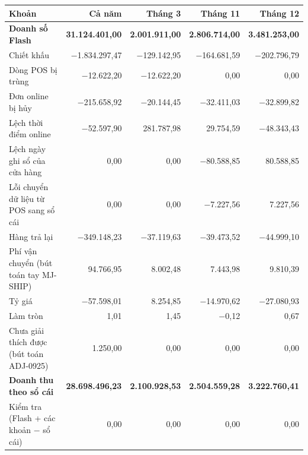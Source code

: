 \begin{tabular}{@{}L{6.0cm} r r r r@{}}
\toprule
Khoản & Cả năm & Tháng 3 & Tháng 11 & Tháng 12 \\
\midrule
\textbf{Doanh số Flash} & \textbf{31.124.401,00} & \textbf{2.001.911,00} & \textbf{2.806.714,00} & \textbf{3.481.253,00} \\
Chiết khấu & $-$1.834.297,47 & $-$129.142,95 & $-$164.681,59 & $-$202.796,79 \\
Dòng POS bị trùng & $-$12.622,20 & $-$12.622,20 & 0,00 & 0,00 \\
Đơn online bị hủy & $-$215.658,92 & $-$20.144,45 & $-$32.411,03 & $-$32.899,82 \\
Lệch thời điểm online & $-$52.597,90 & 281.787,98 & 29.754,59 & $-$48.343,43 \\
Lệch ngày ghi sổ của cửa hàng & 0,00 & 0,00 & $-$80.588,85 & 80.588,85 \\
Lỗi chuyển dữ liệu từ POS sang sổ cái & 0,00 & 0,00 & $-$7.227,56 & 7.227,56 \\
Hàng trả lại & $-$349.148,23 & $-$37.119,63 & $-$39.473,52 & $-$44.999,10 \\
Phí vận chuyển (bút toán tay MJ-SHIP) & 94.766,95 & 8.002,48 & 7.443,98 & 9.810,39 \\
Tỷ giá & $-$57.598,01 & 8.254,85 & $-$14.970,62 & $-$27.080,93 \\
Làm tròn & 1,01 & 1,45 & $-$0,12 & 0,67 \\
Chưa giải thích được (bút toán ADJ-0925) & 1.250,00 & 0,00 & 0,00 & 0,00 \\
\midrule
\textbf{Doanh thu theo sổ cái} & \textbf{28.698.496,23} & \textbf{2.100.928,53} & \textbf{2.504.559,28} & \textbf{3.222.760,41} \\
Kiểm tra (Flash + các khoản $-$ sổ cái) & 0,00 & 0,00 & 0,00 & 0,00 \\
\bottomrule
\end{tabular}
